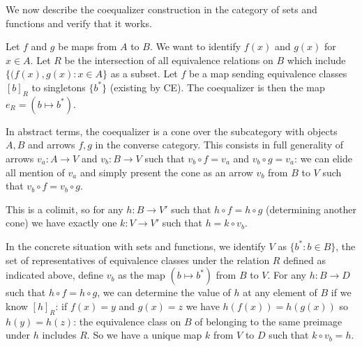 \documentclass[12pt]{article}
\begin{document}
We now describe the coequalizer construction in the category of sets and functions and verify that it works.

Let $f$ and $g$ be maps from $A$ to $B$.  We want to identify $f(x)$ and $g(x)$ for $x \in A$.  Let $R$ be the intersection of all equivalence relations on $B$
which include $\{(f(x),g(x):x \in A\}$ as a subset.  Let $f$ be a map sending equivalence classes $[b]_R$ to singletons $\{b^*\}$ (existing by CE).  The coequalizer is then the map
$e_R = (b \mapsto b^*)$.

In abstract terms, the coequalizer is a cone over the subcategory with objects $A,B$ and arrows $f,g$ in the converse category.  This consists in full generality
of arrows $v_a:A \rightarrow V$ and $v_b:B \rightarrow V$ such that $v_b \circ f = v_a$ and $v_b \circ g = v_a$:  we can elide all mention of $v_a$ and simply present the cone
as an arrow $v_b$ from $B$ to $V$ such that $v_b \circ f = v_b \circ g$.

This is a colimit, so for any $h:B \rightarrow V'$ such that $h \circ f = h \circ g$ (determining another cone) we have exactly one $k: V \rightarrow V'$ such that $h = k \circ v_b$.

In the concrete situation with sets and functions, we identify $V$ as $\{b^*:b \in B\}$, the set of representatives of equivalence classes under the relation $R$ defined
as indicated above, define $v_b$ as the map $(b \mapsto b^*)$ from $B$ to $V$.  For any $h:B \rightarrow D$ such that $h \circ f = h \circ g$, we can determine the value
of $h$ at any element of $B$ if we know $[h]_R$:  if $f(x)=y$ and $g(x)=z$ we have $h(f(x)) = h(g(x))$ so $h(y)=h(z)$:  the equivalence class on $B$ of belonging to the same
preimage under $h$ includes $R$.  So we have a unique map $k$ from  $V$ to $D$ such that $k \circ v_b = h$.
\end{document}
